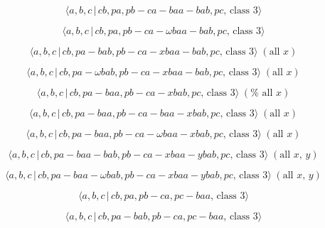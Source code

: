 \documentclass[10pt]{article}
\begin{document}
\begin{equation}
\langle a,b,c\,|\,cb,pa,pb-ca-baa-bab,pc,\,\text{class }3\rangle  \tag{7.884}
\end{equation}

\begin{equation}
\langle a,b,c\,|\,cb,pa,pb-ca-\omega baa-bab,pc,\,\text{class }3\rangle 
\tag{7.885}
\end{equation}

\begin{equation}
\langle a,b,c\,|\,cb,pa-bab,pb-ca-xbaa-bab,pc,\,\text{class }3\rangle \;(%
\text{all }x)  \tag{7.886}
\end{equation}

\begin{equation}
\langle a,b,c\,|\,cb,pa-\omega bab,pb-ca-xbaa-bab,pc,\,\text{class }3\rangle
\;(\text{all }x)  \tag{7.887}
\end{equation}

\begin{equation}
\langle a,b,c\,|\,cb,pa-baa,pb-ca-xbab,pc,\,\text{class }3\rangle \;(\text{%
all }x)  \tag{7.888}
\end{equation}

\begin{equation}
\langle a,b,c\,|\,cb,pa-baa,pb-ca-baa-xbab,pc,\,\text{class }3\rangle \;(%
\text{all }x)  \tag{7.889}
\end{equation}

\begin{equation}
\langle a,b,c\,|\,cb,pa-baa,pb-ca-\omega baa-xbab,pc,\,\text{class }3\rangle
\;(\text{all }x)  \tag{7.890}
\end{equation}

\begin{equation}
\langle a,b,c\,|\,cb,pa-baa-bab,pb-ca-xbaa-ybab,pc,\,\text{class }3\rangle
\;(\text{all }x,\,y)  \tag{7.891}
\end{equation}

\begin{equation}
\langle a,b,c\,|\,cb,pa-baa-\omega bab,pb-ca-xbaa-ybab,pc,\,\text{class }%
3\rangle \;(\text{all }x,\,y)  \tag{7.892}
\end{equation}

\begin{equation}
\langle a,b,c\,|\,cb,pa,pb-ca,pc-baa,\,\text{class }3\rangle  \tag{7.893}
\end{equation}

\begin{equation}
\langle a,b,c\,|\,cb,pa-bab,pb-ca,pc-baa,\,\text{class }3\rangle  \tag{7.894}
\end{equation}
\end{document}
